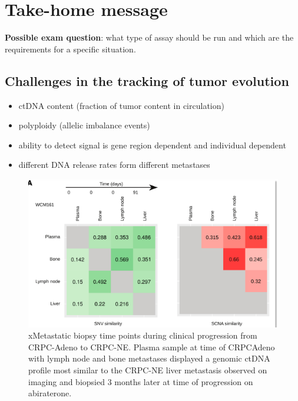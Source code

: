 \section{Take-home message}
\textbf{Possible exam question}: what type of assay should be run and which are the requirements for a specific situation.
\subsection{Challenges in the tracking of tumor evolution}
\begin{itemize}
\item ctDNA content (fraction of tumor content in circulation)
\item polyploidy (allelic imbalance events)
\item ability to detect signal is gene region dependent and individual dependent
\item different DNA release rates form different metastases

\end{itemize}
\begin{figure}[H]
\centering
    \includegraphics[width=0.7\linewidth]{time.png}
    \caption{xMetastatic biopsy time points during clinical progression
from CRPC-Adeno to CRPC-NE. Plasma sample at time of CRPCAdeno with lymph node and bone metastases displayed a genomic ctDNA profile most similar to the CRPC-NE liver metastasis observed on imaging and biopsied 3 months later at time of progression on abiraterone.}
\label{fig:norm}
\end{figure}


